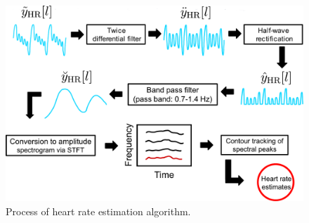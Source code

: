 \documentclass[10.5pt]{jarticle}
\begin{document}
{%
\begin{figure}[tb]
\centering
\vspace{0pt} %
\includegraphics[width=1.0\hsize]{hralgo.pdf}
\vspace{-20pt} %
\caption{Process of heart rate estimation algorithm.}
\vspace{-20pt} %
\label{fig:hralgo}
\end{figure}

}
\end{document}
